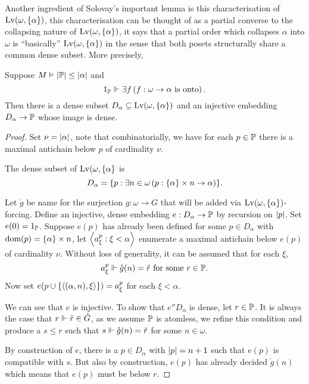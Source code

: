 Another ingredient of Solovay's important lemma is this characterisation of \(\Lv(\omega,\set{\alpha})\),
this characterisation can be thought of as a partial converse to the collapsing nature of \(\Lv(\omega,\set{\alpha})\),
it says that a partial order which collapses \(\alpha\) into \(\omega\) is ``basically'' \(\Lv(\omega,\set{\alpha})\)
in the sense that both posets structurally share a common dense subset.
More precisely,
\begin{lemma}\label{lemma:characterisation_collapse}
    Suppose \(M\models \abs{\P} \leq \abs{\alpha}\) and
    \[ 1_\P \forces \exists f\paren{f:\omega\to\alpha \text{ is onto}}.\]
    Then there is a dense subset \(D_\alpha\subseteq \Lv(\omega,\set{\alpha})\)
    and an injective embedding \(D_\alpha \to \P\) whose image is dense.
\end{lemma}
\begin{proof}
    Set \(\nu = \abs{\alpha}\),
    note that combinatorially, we have for each \(p\in\P\) there is a maximal antichain below \(p\) of cardinality \(\nu\).

    The dense subset of \(\Lv(\omega,\set{\alpha}\) is
    \[ D_\alpha = \set{p: \exists n\in\omega \paren{p: \set{\alpha}\times n\to \alpha}}.\]

    Let \(\mathring{g}\) be name for the surjection \(g:\omega\to G\) that will be added via \(\Lv(\omega,\set{\alpha})\)-forcing.
    Define an injective, dense embedding \(e: D_\alpha\to\P\) by recursion on \(\abs{p}\).
    Set \(e(0) = 1_\P\).
    Suppose \(e(p)\) has already been defined for some \(p\in D_\alpha\) with \(\dom(p) = \set{\alpha}\times n\),
    let \(\Angle{a_\xi^p: \xi<\alpha}\) enumerate a maximal antichain below \(e(p)\) of cardinality \(\nu\).
    Without loss of generality, it can be assumed that for each \(\xi\),
    \[ a_\xi^p \forces \mathring{g}(n) = \check{r} \text{ for some } r\in \P. \]
    Now set \(e(p\cup \set{\Angle{(\alpha, n), \xi}}) = a_\xi^p\) for each \(\xi<\alpha\).

    We can see that \(e\) is injective.
    To show that \(e''D_\alpha\) is dense, let \(r\in \P\).
    It is always the case that \(r\forces \check{r}\in\mathring{G}\),
    as we assume \(\P\) is atomless, we refine this condition and produce a \(s\leq r\)
    such that \(s\forces \mathring{g}(n) = \check{r}\) for some \(n\in\omega\).

    By construction of \(e\), there is a \(p\in D_\alpha\) with \(\abs{p} = n+1\) such that \(e(p)\) is compatible with \(s\).
    But also by construction, \(e(p)\) has already decided \(\mathring{g}(n)\) which means that \(e(p)\) must be below \(r\).
\end{proof}

